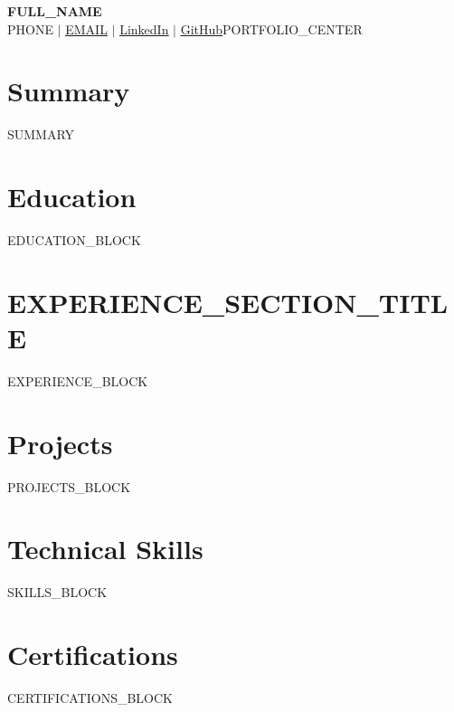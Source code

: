 \documentclass[letterpaper,10pt]{article}
\newcommand{\resumeSubHeadingListStart}{\begin{itemize}[leftmargin=0.15in, label={}]}
\newcommand{\resumeSubHeadingListEnd}{\end{itemize}}
\begin{document}
\begin{center}
    \textbf{\Huge \scshape {{FULL_NAME}}} \\ \vspace{2pt}
    \small {{PHONE}} $|$
    \href{mailto:{{EMAIL}}}{\underline{{{EMAIL}}}} $|$
    \href{{{LINKEDIN_URL}}}{\underline{LinkedIn}} $|$
    \href{{{GITHUB_URL}}}{\underline{GitHub}}{{PORTFOLIO_CENTER}}
\end{center}

\vspace{-4pt}

\section{Summary}
\begin{itemize}[leftmargin=0.15in, label={}]
    \small{\item{{{SUMMARY}}}}
\end{itemize}

\section{Education}
\resumeSubHeadingListStart
{{EDUCATION_BLOCK}}
\resumeSubHeadingListEnd

\section{{{EXPERIENCE_SECTION_TITLE}}}
\resumeSubHeadingListStart
{{EXPERIENCE_BLOCK}}
\resumeSubHeadingListEnd

\section{Projects}
\resumeSubHeadingListStart
{{PROJECTS_BLOCK}}
\resumeSubHeadingListEnd

\section{Technical Skills}
\begin{itemize}[leftmargin=0.15in, label={}]
    \small{\item{
        {{SKILLS_BLOCK}}
    }}
\end{itemize}

\section{Certifications}
\begin{itemize}[leftmargin=0.15in, label={}]
    \small{\item{
        {{CERTIFICATIONS_BLOCK}}
    }}
\end{itemize}
\end{document}
